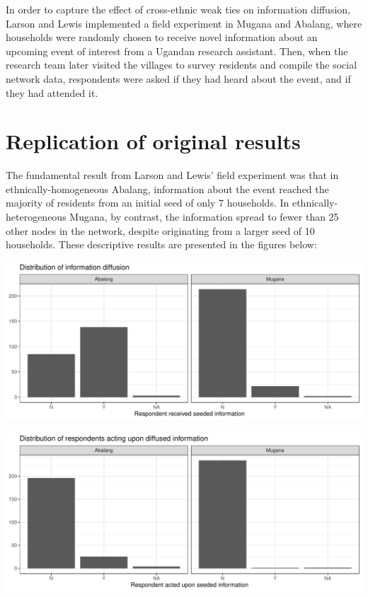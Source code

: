 \documentclass[]{article}
\begin{document}
In order to capture the effect of cross-ethnic weak ties on information diffusion, Larson and Lewis implemented a field experiment in Mugana and Abalang, where households were randomly chosen to receive novel information about an upcoming event of interest from a Ugandan research assistant. Then, when the research team later visited the villages to survey residents and compile the social network data, respondents were asked if they had heard about the event, and if they had attended it. 

\section{Replication of original results}

The fundamental result from Larson and Lewis' field experiment was that in ethnically-homogeneous Abalang, information about the event reached the majority of residents from an initial seed of only 7 households. In ethnically-heterogeneous Mugana, by contrast, the information spread to fewer than 25 other nodes in the network, despite originating from a larger seed of 10 households. These descriptive results are presented in the figures below:

\includegraphics{./figures/info_diffusion.pdf}

\includegraphics{./figures/info_action.pdf}
\end{document}
